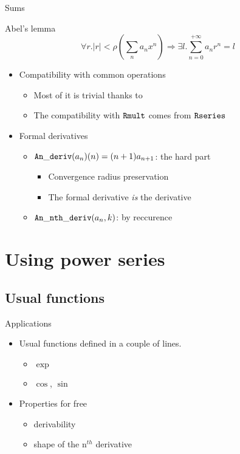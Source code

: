 \documentclass{beamer}
\begin{document}
\begin{frame}{Sums}
\begin{alertblock}{Abel's lemma}
$$\forall r. \left| r \right| < \rho \left( \sum_n a_n x^n \right)
\Rightarrow \exists l. \sum_{n = 0}^{+ \infty} a_n r^n = l$$
\end{alertblock}
\end{frame}

\begin{frame}
\begin{itemize}
  \item Compatibility with common operations
  \begin{itemize}
	\item Most of it is trivial thanks to \rsequence{}
	\item The compatibility with $\tt Rmult$ comes from $\tt Rseries$
  \end{itemize}
  \medskip
  \item Formal derivatives
  \begin{itemize}
    \item $\operatorname{\mathtt{An\_deriv}} (a_n) (n) = (n+1)a_{n+1}$: the hard part
    \begin{itemize}
	  \item Convergence radius preservation
	  \item The formal derivative \emph{is} the derivative
    \end{itemize}
    \item $\operatorname{\mathtt{An\_nth\_deriv}} (a_n,k)$: by reccurence
  \end{itemize}
\end{itemize}
\end{frame}

\section{Using power series}

\subsection{Usual functions}

\begin{frame}{Applications}
\begin{itemize}
 \item Usual functions defined in a couple of lines.
  \begin{itemize}
     \item $\exp$
     \item $\cos$, $\sin$
  \end{itemize}
 \item Properties for free
  \begin{itemize}
    \item derivability
    \item shape of the n$^{th}$ derivative
  \end{itemize}
\end{itemize}
\end{frame}
\end{document}
